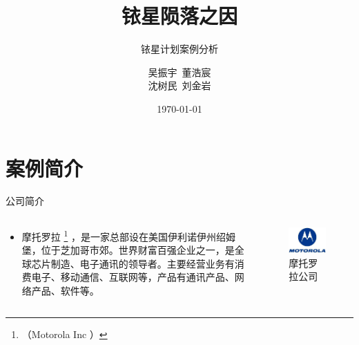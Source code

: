 \documentclass[handout]{ctexbeamer}
\begin{document}

\title{\textbf{铱星陨落之因}}
\subtitle{铱星计划案例分析}
\author{吴振宇~董浩宸\\沈树民~刘金岩}
\date{\today}
\maketitle

\section{案例简介}%
\label{sec:案例简介}

\begin{frame}{公司简介}
	\begin{columns}
		\begin{column}{0.5\textwidth}
			\begin{itemize}
				\item 摩托罗拉 \footnote{（Motorola Inc ）} ，是一家总部设在美国伊利诺伊州绍姆堡，位于芝加哥市郊。世界财富百强企业之一，是全球芯片制造、电子通讯的领导者。主要经营业务有消费电子、移动通信、互联网等，产品有通讯产品、网络产品、软件等。
			\end{itemize}
		\end{column}
		\pause
		\begin{column}{0.5\textwidth}
			\begin{figure}[htpb]
				\centering
				\includegraphics[width=0.8\linewidth]{motorola.jpg}
				\caption{摩托罗拉公司}
				\label{fig:摩托罗拉公司}
			\end{figure}
		\end{column}
	\end{columns}
	\cite{2016企业战略与风险管理}
\end{frame}
\end{document}
